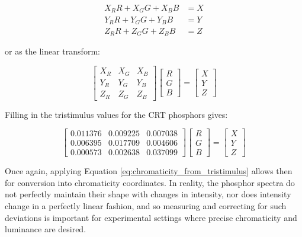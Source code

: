\documentclass{article}
\begin{document}
\begin{multicols}{2}
\begin{equation} %
    \begin{aligned}
        X_RR+X_GG+X_BB&=X\\
        Y_RR+Y_GG+Y_BB&=Y\\
        Z_RR+Z_GG+Z_BB&=Z
    \end{aligned}
\end{equation}

or as the linear transform:

\begin{equation} %
    \begin{bmatrix}
        X_R&X_G&X_B\\
        Y_R&Y_G&Y_B\\
        Z_R&Z_G&Z_B
    \end{bmatrix}\begin{bmatrix}
        R\\
        G\\
        B
    \end{bmatrix}=\begin{bmatrix}
        X\\
        Y\\
        Z
    \end{bmatrix}
\end{equation}

Filling in the tristimulus values for the CRT phosphors gives:

\begin{equation}\label{eq:crt_transformation} %
    \begin{bmatrix}
        0.011376&0.009225&0.007038\\
        0.006395&0.017709&0.004606\\
        0.000573&0.002638&0.037099
    \end{bmatrix}\begin{bmatrix}
        R\\
        G\\
        B
    \end{bmatrix}=\begin{bmatrix}
        X\\
        Y\\
        Z
    \end{bmatrix}
\end{equation}

Once again, applying Equation \ref{eq:chromaticity_from_tristimulus} allows then for conversion into chromaticity coordinates.  In reality, the phosphor spectra do not perfectly maintain their shape with changes in intensity, nor does intensity change in a perfectly linear fashion, and so measuring and correcting for such deviations is important for experimental settings where precise chromaticity and luminance are desired.


\end{multicols}
\end{document}
